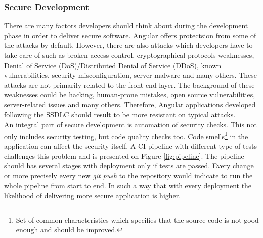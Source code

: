 \documentclass{article} %
\begin{document}
\subsubsection{Secure Development}
There are many factors developers should think about during the development phase in order to deliver secure software. Angular offers protectsion from some of the attacks by default. However, there are also attacks which developers have to take care of such as broken access control, cryptographical protocols weaknesses, Denial of Service (DoS)/Distributed Denial of Service (DDoS), known vulnerabilities, security misconfiguration, server malware and many others. These attacks are not primarily related to the front-end layer. The background of these weaknesses could be hacking, human-prone mistakes, open source vulnerabilities, server-related issues and many others. Therefore, Angular applications developed following the SSDLC should result to be more resistant on typical attacks.\\
\newline
An integral part of secure development is automation of security checks. This not only includes security testing, but code quality checks too. Code smells\footnote{Set of common characteristics which specifies that the source code is not good enough and should be improved.} in the application can affect the security itself. A CI pipeline with different type of tests challenges this problem and is presented on Figure \ref{fig:pipeline}. The pipeline
 should has several stages with deployment only if tests are passed. Every change or more precisely every new \textit{git push} to the repository would indicate to run the whole pipeline from start to end. In such a way that with every deployment the likelihood of delivering more secure application is higher.
\end{document}
